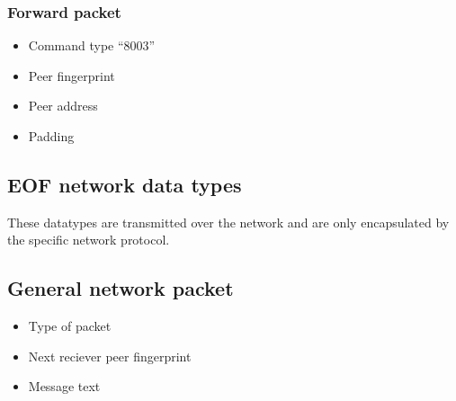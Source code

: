 \documentclass[12pt,a4paper]{article}
\begin{document}
\subsubsection{Forward packet}
\begin{itemize}
\item Command type "`8003"'
\item Peer fingerprint
\item Peer address
\item Padding
\end{itemize}
\subsection{EOF network data types}
These datatypes are transmitted over the network and are only
encapsulated by the specific network protocol.
\subsection{General network packet}
\begin{itemize}
\item Type of packet
\item Next reciever peer fingerprint
\item Message text
\end{itemize}
\end{document}
